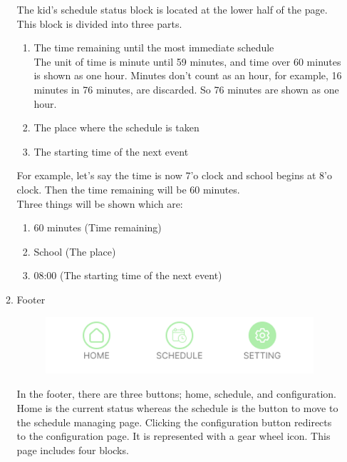 \documentclass[conference]{IEEEtran}
\begin{document}
\begin{enumerate}[label=\arabic*.]
\begin{enumerate}[label=\alph*.]
        The kid’s schedule status block is located at the lower half of the page. This block is divided into three parts. \\
        \begin{enumerate}[label=\roman*.]
            \item {\large{The time remaining until the most immediate schedule}} \\
            The unit of time is minute until 59 minutes, and time over 60 minutes is shown as one hour. Minutes don’t count as an hour, for example, 16 minutes in 76 minutes, are discarded. So 76 minutes are shown as one hour.
            \item {\large{The place where the schedule is taken}}
            \item {\large{The starting time of the next event}}\\
        \end{enumerate}
        For example, let’s say the time is now 7’o clock and school begins at 8’o clock. Then the time remaining will be 60 minutes. \\
        Three things will be shown which are: \\
        \begin{enumerate}[label=\roman*.]
            \item {\large{60 minutes (Time remaining)}} 
            \item {\large{School (The place)}}
            \item {\large{08:00 (The starting time of the next event)}}\\
        \end{enumerate}  
        \item {\large{Footer}} \\
        \begin{figure}[H]\centering\includegraphics[scale=0.65]{images/footer.png}\end{figure} 
        In the footer, there are three buttons; home, schedule, and configuration. Home is the current status whereas the schedule is the button to move to the schedule managing page. Clicking the configuration button redirects to the configuration page. It is represented with a gear wheel icon. This page includes four blocks. \\

\end{enumerate}
\end{enumerate}
\end{document}
